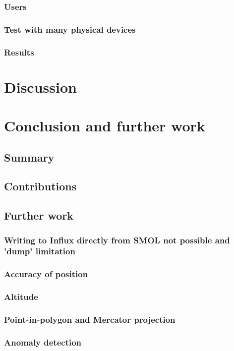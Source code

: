 \documentclass{article}
\begin{document}
\subsubsection{Users}
\subsubsection{Test with many physical devices}
\subsubsection{Results}




\newpage
\section{Discussion}\label{sec:Discussion}




\newpage
\section{Conclusion and further work}\label{sec:Conclusion}
\subsection{Summary}
\subsection{Contributions}
\subsection{Further work}
\subsubsection{Writing to Influx directly from SMOL not possible and 'dump' limitation}
\subsubsection{Accuracy of position}
\subsubsection{Altitude}
\subsubsection{Point-in-polygon and Mercator projection}
\subsubsection{Anomaly detection}



\newpage
\printbibliography
\end{document}
